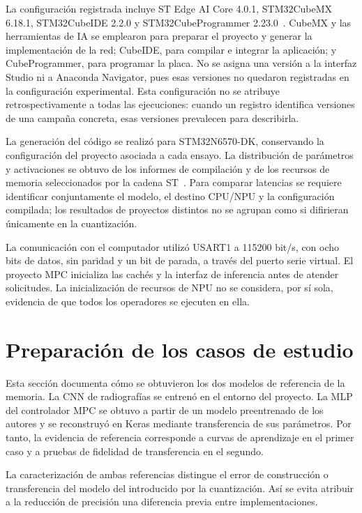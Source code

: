 La configuración registrada incluye ST Edge AI Core 4.0.1, STM32CubeMX 6.18.1, STM32CubeIDE 2.2.0 y STM32CubeProgrammer 2.23.0~\cite{cap5_entorno}. CubeMX y las herramientas de IA se emplearon para preparar el proyecto y generar la implementación de la red; CubeIDE, para compilar e integrar la aplicación; y CubeProgrammer, para programar la placa. No se asigna una versión a la interfaz Studio ni a Anaconda Navigator, pues esas versiones no quedaron registradas en la configuración experimental. Esta configuración no se atribuye retrospectivamente a todas las ejecuciones: cuando un registro identifica versiones de una campaña concreta, esas versiones prevalecen para describirla.

La generación del código se realizó para STM32N6570-DK, conservando la configuración del proyecto asociada a cada ensayo. La distribución de parámetros y activaciones se obtuvo de los informes de compilación y de los recursos de memoria seleccionados por la cadena ST~\cite{cap5_stcompiler}. Para comparar latencias se requiere identificar conjuntamente el modelo, el destino CPU/NPU y la configuración compilada; los resultados de proyectos distintos no se agrupan como si difirieran únicamente en la cuantización.

La comunicación con el computador utilizó USART1 a 115200 bit/s, con ocho bits de datos, sin paridad y un bit de parada, a través del puerto serie virtual. El proyecto MPC inicializa las cachés y la interfaz de inferencia antes de atender solicitudes. La inicialización de recursos de NPU no se considera, por sí sola, evidencia de que todos los operadores se ejecuten en ella.

\section{Preparación de los casos de estudio}\label{sec:preparacion_casos}

Esta sección documenta cómo se obtuvieron los dos modelos de referencia de la memoria. La CNN de radiografías se entrenó en el entorno del proyecto. La MLP del controlador MPC se obtuvo a partir de un modelo preentrenado de los autores y se reconstruyó en Keras mediante transferencia de sus parámetros. Por tanto, la evidencia de referencia corresponde a curvas de aprendizaje en el primer caso y a pruebas de fidelidad de transferencia en el segundo.

La caracterización de ambas referencias distingue el error de construcción o transferencia del modelo del introducido por la cuantización. Así se evita atribuir a la reducción de precisión una diferencia previa entre implementaciones.




